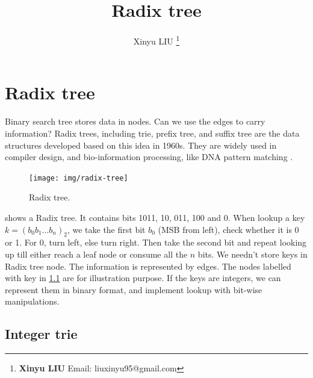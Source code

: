 \documentclass[b5paper]{article}
\begin{document}
\title{Radix tree}

\author{Xinyu LIU
\thanks{{\bfseries Xinyu LIU} \newline
  Email: liuxinyu95@gmail.com \newline}
  }

\maketitle
\fi


\ifx\wholebook\relax
\chapter{Radix tree}
\fi

\label{introduction} 

Binary search tree stores data in nodes. Can we use the edges to carry information? Radix trees, including trie, prefix tree, and suffix tree are the data structures developed based on this idea in 1960s. They are widely used in compiler design\cite{okasaki-int-map}, and bio-information processing, like DNA pattern matching \cite{wiki-suffix-tree}.

\begin{figure}[htbp]
  \centering
  \texttt{[image: img/radix-tree]}
  \caption{Radix tree.}
  \label{fig:radix-tree}
\end{figure}

 shows a Radix tree. It contains bits 1011, 10, 011, 100 and 0. When lookup a key $k=(b_0b_1...b_n)_2$, we take the first bit $b_0$ (MSB from left), check whether it is 0 or 1. For 0, turn left, else turn right. Then take the second bit and repeat looking up till either reach a leaf node or consume all the $n$ bits. We needn't store keys in Radix tree node. The information is represented by edges. The nodes labelled with key in \cref{fig:radix-tree} are for illustration purpose. If the keys are integers, we can represent them in binary format, and implement lookup with bit-wise manipulations.

\section{Integer trie}
\label{int-trie} 
\end{document}
